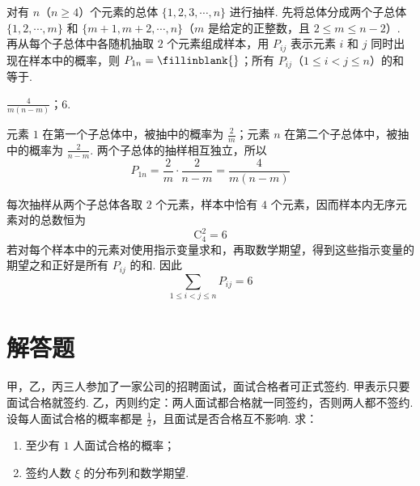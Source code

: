 \begin{problem}
对有 \(n\)（\(n \geqslant 4\)）个元素的总体 \(\{1, 2, 3, \cdots, n\}\) 进行抽样. 先将总体分成两个子总体 \(\{1, 2, \cdots, m\}\) 和 \(\{m + 1, m + 2, \cdots, n\}\)（\(m\) 是给定的正整数，且 \(2 \leqslant m \leqslant n - 2\)）. 再从每个子总体中各随机抽取 \(2\) 个元素组成样本，用 \(P_{ij}\) 表示元素 \(i\) 和 \(j\) 同时出现在样本中的概率，则 \(P_{1n} =\fillinblank{}\)；所有 \(P_{ij}\)（\(1 \leqslant i < j \leqslant n\)）的和等于\fillinblank{}.
\end{problem}

\begin{answer}
\(\frac{4}{m(n-m)}\)；\(6\).
\end{answer}

\begin{solution}
元素 \(1\) 在第一个子总体中，被抽中的概率为 \(\frac2m\)；元素 \(n\) 在第二个子总体中，被抽中的概率为 \(\frac2{n-m}\). 两个子总体的抽样相互独立，所以
\[
P_{1n}=\frac2m\cdot\frac2{n-m}=\frac{4}{m(n-m)}
\]

每次抽样从两个子总体各取 \(2\) 个元素，样本中恰有 \(4\) 个元素，因而样本内无序元素对的总数恒为
\[
\mathrm C_4^2=6
\]
若对每个样本中的元素对使用指示变量求和，再取数学期望，得到这些指示变量的期望之和正好是所有 \(P_{ij}\) 的和. 因此
\[
\sum_{1\leqslant i<j\leqslant n}P_{ij}=6
\]
\end{solution}

\section{解答题}

\begin{problem}
甲，乙，丙三人参加了一家公司的招聘面试，面试合格者可正式签约. 甲表示只要面试合格就签约. 乙，丙则约定：两人面试都合格就一同签约，否则两人都不签约. 设每人面试合格的概率都是 \(\frac{1}{2}\)，且面试是否合格互不影响. 求：
\begin{enumerate}
\item 至少有 \(1\) 人面试合格的概率；
\item 签约人数 \( \xi \) 的分布列和数学期望.
\end{enumerate}
\end{problem}

